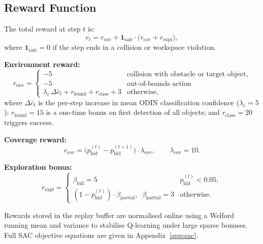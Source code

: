 \documentclass{article}
\newcommand{\phid}{p_{\text{hid}}}
\begin{document}
\subsection{Reward Function}
\label{sec:reward}

The total reward at step $t$ is:
\begin{equation}
  r_t = r_\text{env} + \mathbf{1}_\text{safe} \cdot \bigl(r_\text{cov} + r_\text{expl}\bigr),
  \label{eq:total_reward}
\end{equation}
where $\mathbf{1}_\text{safe} = 0$ if the step ends in a collision or workspace violation.

\textbf{Environment reward:}
\begin{equation}
  r_\text{env} = \begin{cases}
    -5  & \text{collision with obstacle or target object}, \\
    -5  & \text{out-of-bounds action} \\
    \lambda_c\,\Delta \bar{c}_t + r_\text{found} + r_\text{class} + 3 & \text{otherwise},
  \end{cases}
\end{equation}
where $\Delta\bar{c}_t$ is the per-step increase in mean ODIN classification confidence ($\lambda_c = 5$); $r_\text{found} = 15$ is a one-time bonus on first detection of all objects; and $r_\text{class} = 20$ triggers success.

\textbf{Coverage reward:}
\begin{equation}
  r_\text{cov} = \bigl(\phid^{(t)} - \phid^{(t+1)}\bigr) \cdot \lambda_\text{cov},
  \qquad \lambda_\text{cov} = 10.
  \label{eq:rew_cov}
\end{equation}

\textbf{Exploration bonus:}
\begin{equation}
  r_\text{expl} = \begin{cases}
    \beta_\text{full} = 5 & \phid^{(t)} < 0.05, \\
    (1 - \phid^{(t)}) \cdot \beta_\text{partial},\;\; \beta_\text{partial} = 3 & \text{otherwise}.
  \end{cases}
\end{equation}

Rewards stored in the replay buffer are normalised online using a Welford running mean and variance to stabilise Q-learning under large sparse bonuses. Full SAC objective equations are given in Appendix~\ref{app:sac}.

\FloatBarrier
\end{document}
